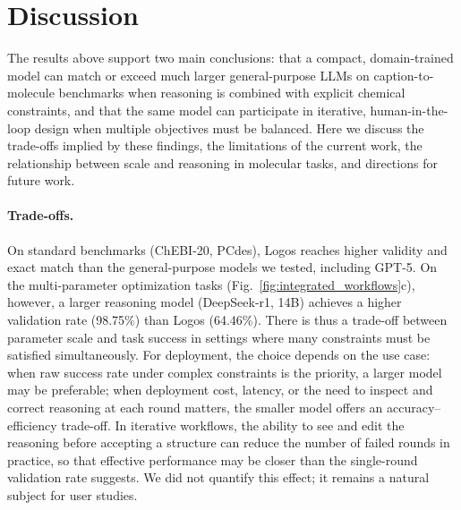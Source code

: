 \documentclass[11pt]{article}
\begin{document}
\section{Discussion}

The results above support two main conclusions: that a compact, domain-trained model can match or exceed much larger general-purpose LLMs on caption-to-molecule benchmarks when reasoning is combined with explicit chemical constraints, and that the same model can participate in iterative, human-in-the-loop design when multiple objectives must be balanced. Here we discuss the trade-offs implied by these findings, the limitations of the current work, the relationship between scale and reasoning in molecular tasks, and directions for future work.

\paragraph{Trade-offs.}
On standard benchmarks (ChEBI-20, PCdes), Logos reaches higher validity and exact match than the general-purpose models we tested, including GPT-5. On the multi-parameter optimization tasks (Fig.~\ref{fig:integrated_workflows}c), however, a larger reasoning model (DeepSeek-r1, 14B) achieves a higher validation rate (98.75\%) than Logos (64.46\%). There is thus a trade-off between parameter scale and task success in settings where many constraints must be satisfied simultaneously. For deployment, the choice depends on the use case: when raw success rate under complex constraints is the priority, a larger model may be preferable; when deployment cost, latency, or the need to inspect and correct reasoning at each round matters, the smaller model offers an accuracy--efficiency trade-off. In iterative workflows, the ability to see and edit the reasoning before accepting a structure can reduce the number of failed rounds in practice, so that effective performance may be closer than the single-round validation rate suggests. We did not quantify this effect; it remains a natural subject for user studies.
\end{document}
